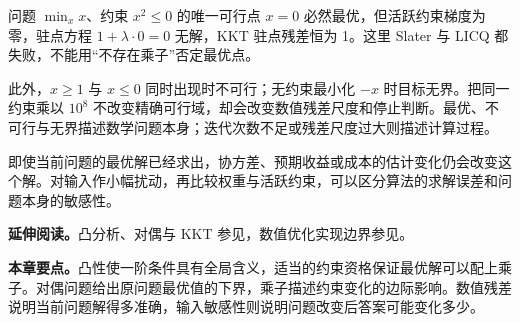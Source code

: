 问题 $\min_xx$、约束 $x^2\le0$ 的唯一可行点 $x=0$ 必然最优，但活跃约束梯度为零，驻点方程 $1+\lambda\cdot0=0$ 无解，KKT 驻点残差恒为 1。这里 Slater 与 LICQ 都失败，不能用“不存在乘子”否定最优点。

此外，$x\ge1$ 与 $x\le0$ 同时出现时不可行；无约束最小化 $-x$ 时目标无界。把同一约束乘以 $10^8$ 不改变精确可行域，却会改变数值残差尺度和停止判断。最优、不可行与无界描述数学问题本身；迭代次数不足或残差尺度过大则描述计算过程。


即使当前问题的最优解已经求出，协方差、预期收益或成本的估计变化仍会改变这个解。对输入作小幅扰动，再比较权重与活跃约束，可以区分算法的求解误差和问题本身的敏感性。

\noindent\textbf{延伸阅读。}凸分析、对偶与 KKT 参见\cite{boyd2004convex}，数值优化实现边界参见\cite{nocedal2006numerical}。




\noindent\textbf{本章要点。}凸性使一阶条件具有全局含义，适当的约束资格保证最优解可以配上乘子。对偶问题给出原问题最优值的下界，乘子描述约束变化的边际影响。数值残差说明当前问题解得多准确，输入敏感性则说明问题改变后答案可能变化多少。